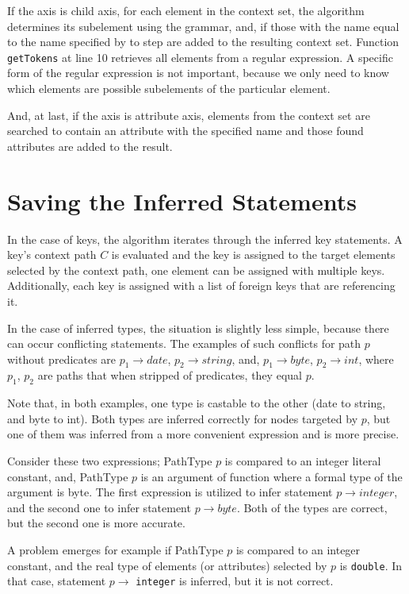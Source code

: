 If the axis is child axis, for each element in the context set, the algorithm determines its subelement using the grammar, and, if those with the name equal to the name specified by to step are added to the resulting context set. Function \texttt{getTokens} at line 10 retrieves all elements from a regular expression. A specific form of the regular expression is not important, because we only need to know which elements are possible subelements of the particular element.

And, at last, if the axis is attribute axis, elements from the context set are searched to contain an attribute with the specified name and those found attributes are added to the result.

\section{Saving the Inferred Statements}
In the case of keys, the algorithm iterates through the inferred key statements. A key's context path $C$ is evaluated and the key is assigned to the target elements selected by the context path, one element can be assigned with multiple keys. Additionally, each key is assigned with a list of foreign keys that are referencing it.

In the case of inferred types, the situation is slightly less simple, because there can occur conflicting statements. The examples of such conflicts for path $p$ without predicates are $p_1 \rightarrow date$, $p_2 \rightarrow string$, and, $p_1 \rightarrow byte$, $p_2 \rightarrow int$, where $p_1$, $p_2$ are paths that when stripped of predicates, they equal $p$.

Note that, in both examples, one type is castable to the other (date to string, and byte to int). Both types are inferred correctly for nodes targeted by $p$, but one of them was inferred from a more convenient expression and is more precise.

Consider these two expressions; PathType $p$ is compared to an integer literal constant, and, PathType $p$ is an argument of function where a formal type of the argument is byte. The first expression is utilized to infer statement $p \rightarrow integer$, and the second one to infer statement $p \rightarrow byte$. Both of the types are correct, but the second one is more accurate.

A problem emerges for example if PathType $p$ is compared to an integer constant, and the real type of elements (or attributes) selected by $p$ is \texttt{double}. In that case, statement $p \rightarrow$ \texttt{integer} is inferred, but it is not correct.

